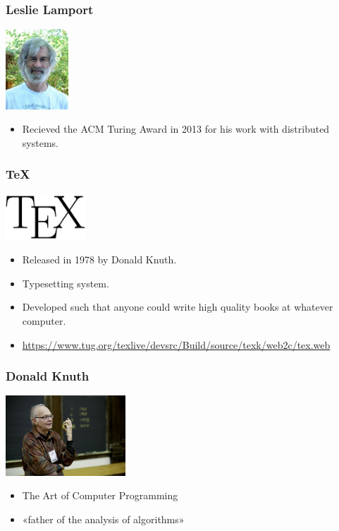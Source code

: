 \documentclass[10pt]{beamer}
\begin{document}
\begin{frame}\frametitle{Leslie Lamport}

\begin{center}
\includegraphics[height=3cm]{img/lamport.jpg}
\end{center}

\begin{itemize}
	\item
	Recieved the ACM Turing Award in 2013 for his work with distributed systems.
\end{itemize}
\end{frame}

\begin{frame}\frametitle{\TeX}

\begin{center}
\includegraphics[width=3cm]{img/texlogo.png}
\end{center}

\begin{itemize}
	\item
	Released in 1978 by Donald Knuth.
	\item
	Typesetting system.
	\item
	Developed such that anyone could write high quality books at whatever computer.
	\item
	\url{https://www.tug.org/texlive/devsrc/Build/source/texk/web2c/tex.web}
\end{itemize}
\end{frame}

\begin{frame}\frametitle{Donald Knuth}

\begin{center}
\includegraphics[height=3cm]{img/knuth.jpg}
\end{center}

\begin{itemize}
	\item
	The Art of Computer Programming
	\item
	«father of the analysis of algorithms»
\end{itemize}
\end{frame}
\end{document}
